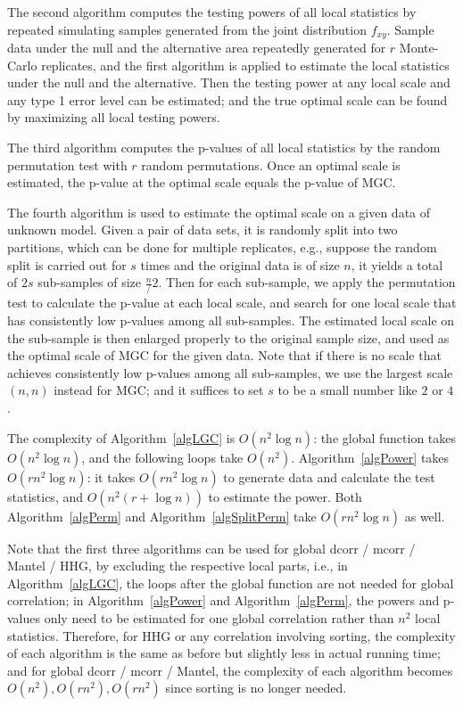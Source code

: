 \documentclass[11pt]{article}
\begin{document}
The second algorithm computes the testing powers of all local statistics by repeated simulating samples generated from the joint distribution $f_{xy}$. Sample data under the null and the alternative area repeatedly generated for $r$ Monte-Carlo replicates, and the first algorithm is applied to estimate the local statistics under the null and the alternative. Then the testing power at any local scale and any type 1 error level can be estimated; and the true optimal scale can be found by maximizing all local testing powers.

The third algorithm computes the p-values of all local statistics by the random permutation test with $r$ random permutations. Once an optimal scale is estimated, the p-value at the optimal scale equals the p-value of MGC.

The fourth algorithm is used to estimate the optimal scale on a given data of unknown model. Given a pair of data sets, it is randomly split into two partitions, which can be done for multiple replicates, e.g., suppose the random split is carried out for $s$ times and the original data is of size $n$, it yields a total of $2s$ sub-samples of size $\frac{n}/2$. Then for each sub-sample, we apply the permutation test to calculate the p-value at each local scale, and search for one local scale that has consistently low p-values among all sub-samples. The estimated local scale on the sub-sample is then enlarged properly to the original sample size, and used as the optimal scale of MGC for the given data. Note that if there is no scale that achieves consistently low p-values among all sub-samples, we use the largest scale $(n,n)$ instead for MGC; and it suffices to set $s$ to be a small number like $2$ or $4$.

The complexity of Algorithm~\ref{algLGC} is $O(n^2 \log n)$: the global function takes $O(n^2 \log n)$, and the following loops take $O(n^2)$. Algorithm~\ref{algPower} takes $O(rn^2 \log n)$: it takes $O(rn^2 \log n)$ to generate data and calculate the test statistics, and $O(n^2 (r+\log n))$ to estimate the power. Both Algorithm~\ref{algPerm} and Algorithm~\ref{algSplitPerm} take $O(rn^2 \log n)$ as well. 

Note that the first three algorithms can be used for global dcorr / mcorr / Mantel / HHG, by excluding the respective local parts, i.e., in Algorithm~\ref{algLGC}, the loops after the global function are not needed for global correlation; in Algorithm~\ref{algPower} and Algorithm~\ref{algPerm}, the powers and p-values only need to be estimated for one global correlation rather than $n^2$ local statistics. Therefore, for HHG or any correlation involving sorting, the complexity of each algorithm is the same as before but slightly less in actual running time; and for global dcorr / mcorr / Mantel, the complexity of each algorithm becomes $O(n^2), O(rn^2), O(rn^2)$ since sorting is no longer needed.
\end{document}

